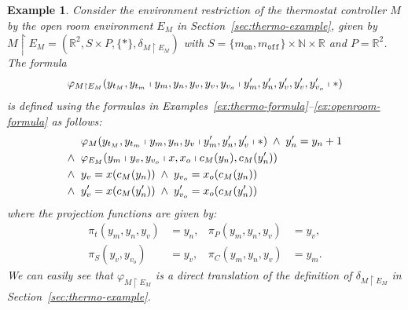 \documentclass{sig-alternate}
\newtheorem{example}{Example}
\begin{document}
\begin{example}
Consider the environment restriction 
of the thermostat controller $M$ by the open room environment $E_M$
in Section~\ref{sec:thermo-example},
given by
$M \restriction E_M = (\mathbb{R}^2, S \times P, \{\ast\}, \delta_{M \restriction E_M})$
with 
 $S = \{m_\texttt{on},m_\texttt{off}\} \times \mathbb{N} \times \mathbb{R}$
 and
$P = \mathbb{R}^2$.
The formula 
\[\varphi_{M \restriction E_M}(
y_{t_{M}}, y_{t_{m}}\shortmid
y_m, y_n, y_v, y_v, y_{v_o}\shortmid
y_m', y_n', y_v', y_v', y_{v_o}'\shortmid
\ast)\]
is defined 
using the formulas in 
Examples~\ref{ex:thermo-formula}--\ref{ex:openroom-formula}
as follows:
\begin{align*}
&
\varphi_{M}( y_{t_{M}}, y_{t_{m}}\shortmid y_m, y_n, y_v\shortmid y_m', y_n', y_v'\shortmid \ast) 
\;\wedge\;
y_n' = y_n + 1
\\
\wedge\;\;&
\varphi_{E_M}(y_m \shortmid y_v, y_{v_o}\shortmid x, x_o\shortmid  c_M(y_n),c_M(y_n'))
\\
\wedge\;\;&
y_v = x(c_M(y_n))
\;\wedge\;
y_{v_o} = x_o(c_M(y_n))
\\
\wedge\;\;&
y_v' = x(c_M(y_n'))
\;\wedge\;
y_{v_o}' = x_o(c_M(y_n'))
\end{align*}
where the projection functions are given by:
\begin{align*}
\pi_t(y_m, y_n, y_v) &= y_n,
&
\pi_P(y_m, y_n, y_v) &= y_v,
\\
\pi_S(y_v, y_{v_o}) &= y_v,
&
\pi_C(y_m, y_n, y_v) &= y_m.
\end{align*}
We can easily see that 
 $\varphi_{M \restriction E_M}$ is a direct translation of the 
definition of  $\delta_{M \restriction E_M}$
in Section~\ref{sec:thermo-example}.
\end{example}
\end{document}
